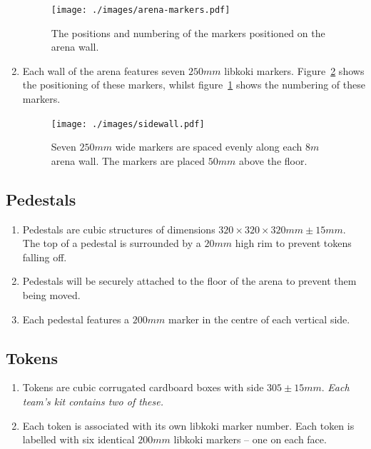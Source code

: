 \begin{enumerate}
  \begin{figure}
    \centering
    \texttt{[image: ./images/arena-markers.pdf]}
    \caption{The positions and numbering of the markers positioned on the arena wall.}
    \label{fig:arena-zones}
  \end{figure}

\item Each wall of the arena features seven $250mm$ libkoki markers.
      Figure~\ref{fig:arena-wall} shows the positioning of these markers, whilst figure~\ref{fig:arena-zones} shows the numbering of these markers.

  \begin{figure}
    \centering
    \texttt{[image: ./images/sidewall.pdf]}
    \caption{Seven $250mm$ wide markers are spaced evenly along each $8m$ arena wall.
             The markers are placed $50mm$ above the floor.}
    \label{fig:arena-wall}
  \end{figure}

\end{enumerate}

\subsection{Pedestals}
\label{sub:pedestals}
\begin{enumerate}
\item Pedestals are cubic structures of dimensions $320 \times 320 \times 320mm \pm 15mm$.
      The top of a pedestal is surrounded by a $20mm$ high rim to prevent tokens falling off.

\item Pedestals will be securely attached to the floor of the arena to prevent them being moved.

\item Each pedestal features a $200mm$ marker in the centre of each vertical side.

\end{enumerate}

\subsection{Tokens}
\label{sub:Tokens}
\begin{enumerate}
\item Tokens are cubic corrugated cardboard boxes with side $305 \pm 15 mm$.
      \emph{Each team's kit contains two of these.}

\item Each token is associated with its own libkoki marker number.
      Each token is labelled with six identical $200mm$ libkoki markers -- one on each face.
\end{enumerate}

\clearpage
